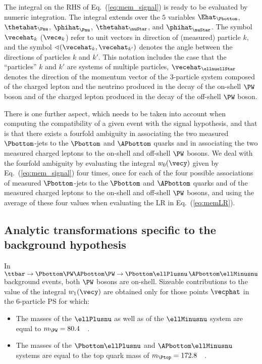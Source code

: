 The integral on the RHS of Eq.~(\ref{eq:mem_signal}) is ready to be evaluated by numeric integration. 
The integral extends over the $5$ variables
 $\Ehat_{\Pbottom}$, $\thetahat_{\Pnu}$, $\phihat_{\Pnu}$, $\thetahat_{\nuStar}$, and $\phihat_{\nuStar}$.
The symbol $\vecehat_{k}$ ($\vece_{k}$) refer to unit vectors in direction of (measured) particle $k$,
and the symbol $\sphericalangle(\vecehat_{k},\vecehat_{k'})$ denotes the angle between the directions of particles $k$ and $k'$.
This notation includes the case that the ``particles'' $k$ and $k'$ are systems of multiple particles,
\eg $\vecehat_{\ellnuellStar}$ denotes the direction of the momentum vector of the $3$-particle system composed of
the charged lepton and the neutrino produced in the decay of the on-shell $\PW$ boson and of the charged lepton produced in the decay of the off-shell $\PW$ boson.

There is one further aspect, which needs to be taken into account when computing the compatibility of a given event with the signal hypothesis,
and that is that there exists a fourfold ambiguity in associating the two measured $\Pbottom$-jets to the $\Pbottom$ and $\APbottom$ quarks 
and in associating the two measured charged leptons to the on-shell and off-shell $\PW$ bosons.
We deal with the fourfold ambiguity by evaluating the integral $w_{0}(\vecy)$ given by Eq.~(\ref{eq:mem_signal}) four times,
once for each of the four possible associations of measured $\Pbottom$-jets to the $\Pbottom$ and $\APbottom$ quarks and of the measured charged leptons to the on-shell and off-shell $\PW$ bosons,
and using the average of these four values when evaluating the LR in Eq.~(\ref{eq:memLR}).


\subsection{Analytic transformations specific to the background hypothesis}
\label{sec:mem_background}

In $\ttbar \to \Pbottom\PW\APbottom\PW \to \Pbottom\ellPlusnu \, \APbottom\ellMinusnu$ background events,
both $\PW$ bosons are on-shell. Sizeable contributions to the value of the integral $w_{1}(\vecy)$ are obtained only
for those points $\vecphat$ in the $6$-particle PS for which:
\begin{itemize}
\item The masses of the $\ellPlusnu$ as well as of the $\ellMinusnu$ system are equal to $m_{\PW} = 80.4$~\GeV~\cite{PDG}.
\item The masses of the $\Pbottom\ellPlusnu$ and $\APbottom\ellMinusnu$ systems are equal to the top quark mass of $m_{\Ptop} = 172.8$~\GeV~\cite{PDG}.
\end{itemize}


